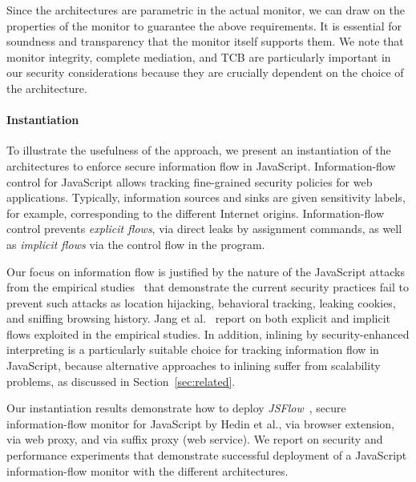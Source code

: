 \documentclass{llncs}
\begin{document}
Since the architectures are parametric in the actual monitor, we can
draw on the properties of the monitor to guarantee the
above requirements.
It is essential for soundness and transparency that the monitor itself supports them. 
We note that monitor integrity,
complete mediation, and TCB are particularly important in our security
considerations because they are crucially dependent on the choice of
the architecture.

\vspace{-.4cm}
\paragraph{Instantiation}
To illustrate the usefulness of the approach, we present an
instantiation of the architectures to enforce secure information flow
in JavaScript. Information-flow control for JavaScript allows tracking
fine-grained security policies for web applications. Typically,
information sources  and sinks are given sensitivity labels, for
example, corresponding to the different Internet origins.
Information-flow control prevents \emph{explicit flows}, via
direct leaks by assignment commands, as well as
\emph{implicit flows} via the control flow in the program.

Our focus on information flow is justified by
the nature of the JavaScript attacks from the empirical
studies~\cite{Jang+:CCS10,Nikiforakis+:CCS12} that demonstrate the current security
practices fail to  prevent such attacks as
location
hijacking, behavioral tracking, leaking cookies, and sniffing browsing
history. Jang et al.~\cite{Jang+:CCS10} report on both explicit and
implicit flows exploited in the empirical studies.
%
In addition, inlining by security-enhanced interpreting is a
particularly suitable choice for tracking information flow in
JavaScript, because alternative approaches to inlining suffer from
scalability problems, as discussed in Section~\ref{sec:related}. 

Our instantiation results demonstrate how to deploy
\emph{JSFlow}~\cite{Hedin:Sabelfeld:CSF12,JSFlow}, secure information-flow
monitor for JavaScript by Hedin et al., via
browser extension, via web proxy, and via suffix proxy (web service).
%
We report on security and performance experiments that demonstrate successful deployment of a JavaScript
information-flow monitor with the different architectures.


\end{document}
